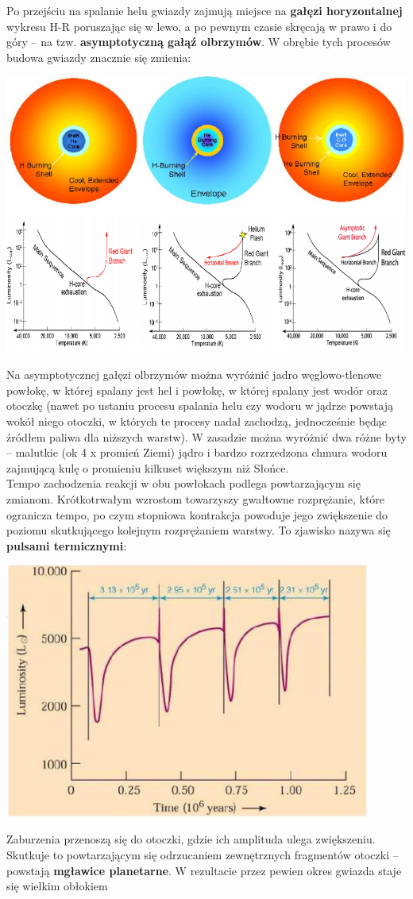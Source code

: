 \documentclass[../index.tex]{subfiles}
\begin{document}
        Po przejściu na spalanie helu gwiazdy zajmują miejsce na \textbf{gałęzi horyzontalnej} wykresu H-R poruszając się w lewo, a po pewnym czasie skręcają w prawo i do góry – na tzw. \textbf{asymptotyczną gałąź olbrzymów}. W obrębie tych procesów budowa gwiazdy znacznie się zmienia:
        \begin{center}
            \includegraphics[width=14cm]{images/ewolucjaGwiazdOlbrzymy.png}
        \end{center}
        Na asymptotycznej gałęzi olbrzymów można wyróżnić jadro węglowo-tlenowe powłokę, w której spalany jest hel i powłokę, w której spalany jest wodór oraz otoczkę (nawet po ustaniu procesu spalania helu czy wodoru w jądrze powstają wokół niego otoczki, w których te procesy nadal zachodzą, jednocześnie będąc źródłem paliwa dla niższych warstw). W zasadzie można wyróżnić dwa różne byty – malutkie (ok 4 x promień Ziemi) jądro i bardzo rozrzedzona chmura wodoru zajmującą kulę o promieniu kilkuset większym niż Słońce.\\
        Tempo zachodzenia reakcji w obu powłokach podlega powtarzającym się zmianom. Krótkotrwałym wzrostom towarzyszy gwałtowne rozprężanie, które ogranicza tempo, po czym stopniowa kontrakcja powoduje jego zwiększenie do poziomu skutkującego kolejnym rozprężaniem warstwy. To zjawisko nazywa się \textbf{pulsami termicznymi}:
        \begin{center}
            \includegraphics[width=12cm]{images/pulsyTermiczne.png}
        \end{center}
        Zaburzenia przenoszą się do otoczki, gdzie ich amplituda ulega zwiększeniu. Skutkuje to powtarzającym się odrzucaniem zewnętrznych fragmentów otoczki – powstają \textbf{mgławice planetarne}. W rezultacie przez pewien okres gwiazda staje się wielkim obłokiem 
\end{document}
